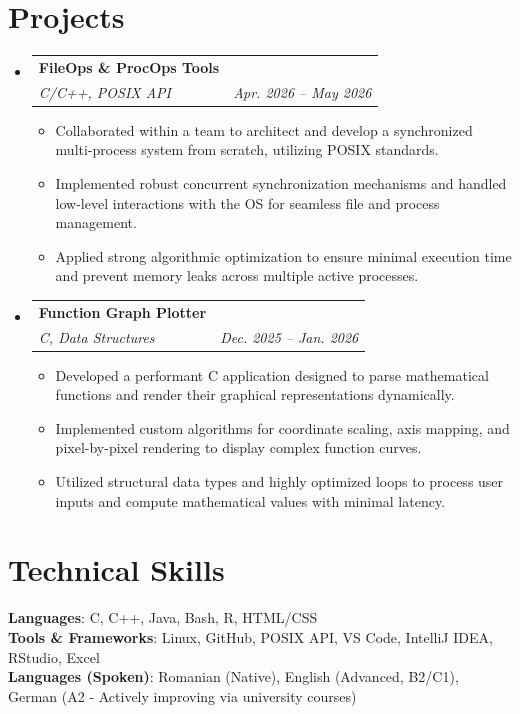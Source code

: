 \documentclass[letterpaper,11pt]{article}
\makeatletter
\newcommand{\resumeItem}[1]{
  \item\small{
    {#1 \vspace{-2pt}}
  }
}
\newcommand{\resumeSubheading}[4]{
  \vspace{-2pt}\item
    \begin{tabular*}{0.97\textwidth}[t]{l@{\extracolsep{\fill}}r}
      \textbf{#1} & #2 \\
      \textit{\small#3} & \textit{\small #4} \\
    \end{tabular*}\vspace{-7pt}
}
\newcommand{\resumeSubHeadingListStart}{\begin{itemize}[leftmargin=0.15in, label={}]}
\newcommand{\resumeSubHeadingListEnd}{\end{itemize}}
\newcommand{\resumeItemListStart}{\begin{itemize}}
\newcommand{\resumeItemListEnd}{\end{itemize}\vspace{-5pt}}
\makeatother
\begin{document}
\section{Projects}
  \resumeSubHeadingListStart
    \resumeSubheading
      {FileOps \& ProcOps Tools}{}
      {C/C++, POSIX API}{Apr. 2026 -- May 2026}
      \resumeItemListStart
        \resumeItem{Collaborated within a team to architect and develop a synchronized multi-process system from scratch, utilizing POSIX standards.}
        \resumeItem{Implemented robust concurrent synchronization mechanisms and handled low-level interactions with the OS for seamless file and process management.}
        \resumeItem{Applied strong algorithmic optimization to ensure minimal execution time and prevent memory leaks across multiple active processes.}
      \resumeItemListEnd

    \resumeSubheading
      {Function Graph Plotter}{}
      {C, Data Structures}{Dec. 2025 -- Jan. 2026}
      \resumeItemListStart
        \resumeItem{Developed a performant C application designed to parse mathematical functions and render their graphical representations dynamically.}
        \resumeItem{Implemented custom algorithms for coordinate scaling, axis mapping, and pixel-by-pixel rendering to display complex function curves.}
        \resumeItem{Utilized structural data types and highly optimized loops to process user inputs and compute mathematical values with minimal latency.}
      \resumeItemListEnd
  \resumeSubHeadingListEnd

\section{Technical Skills}
 \begin{itemize}[leftmargin=0.15in, label={}]
    \small{\item{
     \textbf{Languages}{: C, C++, Java, Bash, R, HTML/CSS} \\
     \textbf{Tools \& Frameworks}{: Linux, GitHub, POSIX API, VS Code, IntelliJ IDEA, RStudio, Excel} \\
     \textbf{Languages (Spoken)}{: Romanian (Native), English (Advanced, B2/C1), German (A2 - Actively improving via university courses)} \\
    }}
 \end{itemize}
\end{document}

